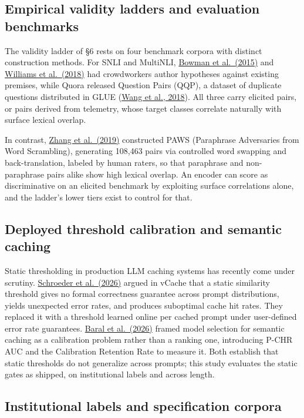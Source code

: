 \documentclass[11pt]{article}
\begin{document}
\subsection{Empirical validity ladders and evaluation benchmarks}

The validity ladder of \S6 rests on four benchmark corpora with distinct construction methods. For SNLI and MultiNLI, \hyperlink{bib:bowman}{Bowman et al.\ (2015)} and \hyperlink{bib:williams}{Williams et al.\ (2018)} had crowdworkers author hypotheses against existing premises, while Quora released Question Pairs (QQP), a dataset of duplicate questions distributed in GLUE (\hyperlink{bib:wangglue}{Wang et al., 2018}). All three carry elicited pairs, or pairs derived from telemetry, whose target classes correlate naturally with surface lexical overlap.

In contrast, \hyperlink{bib:zhang}{Zhang et al.\ (2019)} constructed PAWS (Paraphrase Adversaries from Word Scrambling), generating 108,463 pairs via controlled word swapping and back-translation, labeled by human raters, so that paraphrase and non-paraphrase pairs alike show high lexical overlap. An encoder can score as discriminative on an elicited benchmark by exploiting surface correlations alone, and the ladder's lower tiers exist to control for that.

\subsection{Deployed threshold calibration and semantic caching}

Static thresholding in production LLM caching systems has recently come under scrutiny. \hyperlink{bib:schroeder}{Schroeder et al.\ (2026)} argued in vCache that a static similarity threshold gives no formal correctness guarantee across prompt distributions, yields unexpected error rates, and produces suboptimal cache hit rates. They replaced it with a threshold learned online per cached prompt under user-defined error rate guarantees. \hyperlink{bib:baral}{Baral et al.\ (2026)} framed model selection for semantic caching as a calibration problem rather than a ranking one, introducing P-CHR AUC and the Calibration Retention Rate to measure it. Both establish that static thresholds do not generalize across prompts; this study evaluates the static gates as shipped, on institutional labels and across length.

\subsection{Institutional labels and specification corpora}
\end{document}
